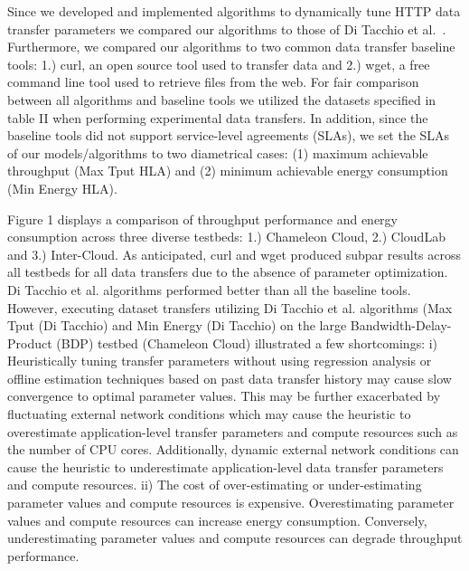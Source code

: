 \documentclass[conference]{IEEEtran}
\begin{document}
Since we developed and implemented algorithms to dynamically tune HTTP data transfer parameters we compared our algorithms to those of Di Tacchio et al.~\cite{di2019cross}. %
Furthermore, we compared our algorithms to two common data transfer baseline tools: 1.) curl, an open source tool used to transfer data and 2.) wget, a free command line tool used to retrieve files from the web. %
For fair comparison between all algorithms and baseline tools we utilized the datasets specified in table II when performing experimental data transfers. In addition, since the baseline tools did not support service-level agreements (SLAs), we set the SLAs of our models/algorithms to two diametrical %
cases: (1) maximum achievable throughput (Max Tput HLA) and (2) minimum achievable energy consumption (Min Energy HLA).\par 
Figure 1 displays a comparison of throughput performance and energy consumption across three diverse testbeds: 1.) Chameleon Cloud, 2.) CloudLab and 3.) Inter-Cloud. As anticipated, curl and wget produced subpar results %
across all testbeds for all data transfers due to the absence of parameter optimization. Di Tacchio et al. algorithms performed better than all the baseline tools. However, executing  dataset transfers utilizing Di Tacchio et al. algorithms (Max Tput (Di Tacchio) and Min Energy (Di Tacchio) on the large Bandwidth-Delay-Product (BDP) testbed (Chameleon Cloud) illustrated a few  shortcomings: i) Heuristically tuning transfer parameters without using regression analysis or offline estimation techniques based on past data transfer history may cause slow convergence to optimal parameter values. This may be further exacerbated by fluctuating external network conditions which may cause the heuristic to overestimate application-level transfer parameters and compute resources such as the number of CPU cores. Additionally, dynamic external network conditions can cause the heuristic to underestimate application-level data transfer parameters and compute resources. ii) The cost of over-estimating or under-estimating parameter values and compute resources is expensive. Overestimating  parameter values and compute resources can increase energy consumption. Conversely, underestimating parameter values and compute resources can degrade throughput performance. 
\end{document}
